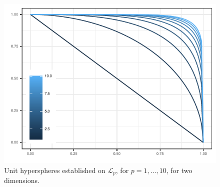 \begin{figure}[htb]
    \centering
    \includegraphics{images/p_sphere}
    \caption{Unit hyperspheres established on $\mathcal{L}_p$, for $p = 1,\ldots,10$, for two dimensions.\label{fig:psphere}}
\end{figure}

